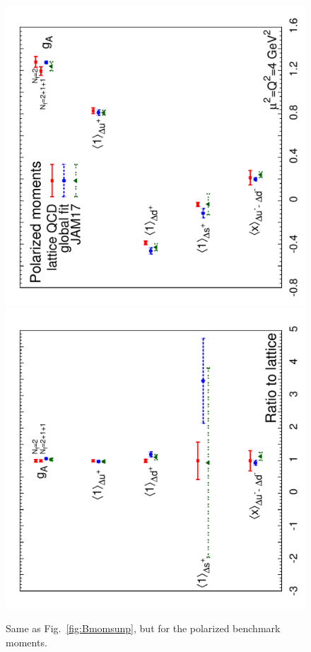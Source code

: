 \begin{figure}[!t]
\centering
\includegraphics[scale=0.44,angle=270]{plots/polmoms}
\includegraphics[scale=0.44,angle=270]{plots/polmomsratio}\\
\caption{\small Same as Fig.~\ref{fig:Bmomsunp}, but for the polarized
benchmark moments.}
\label{fig:Bmomspol}
\end{figure} 

